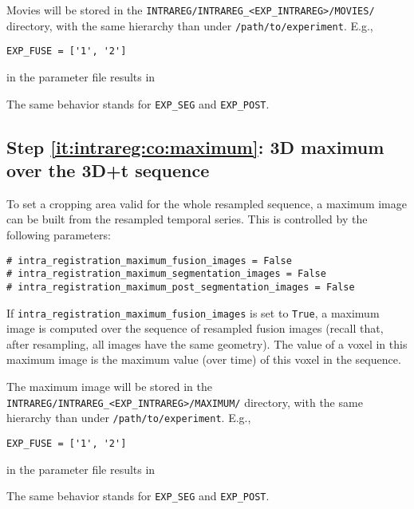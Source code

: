 Movies will be stored in the
\texttt{INTRAREG/INTRAREG\_<EXP\_INTRAREG>/MOVIES/} directory, with the same
hierarchy than under \texttt{/path/to/experiment}. E.g., 
\begin{verbatim}
EXP_FUSE = ['1', '2']
\end{verbatim}
in the parameter file results in

\mbox{}
\mbox{}

The same behavior stands for \texttt{EXP\_SEG} and  \texttt{EXP\_POST}.

\subsection{Step \ref{it:intrareg:co:maximum}: 3D maximum over the 3D+t sequence}
\label{sec:cli:intraregistration:maximum}

To set a cropping area valid for the whole resampled sequence, a maximum image can be built from the resampled temporal series. This is controlled by the following parameters:
\begin{verbatim}
# intra_registration_maximum_fusion_images = False
# intra_registration_maximum_segmentation_images = False
# intra_registration_maximum_post_segmentation_images = False
\end{verbatim}

If \verb|intra_registration_maximum_fusion_images| is set to \verb|True|, a maximum image is computed over the sequence of resampled fusion images (recall that, after resampling, all images have the same geometry). The value of a voxel in this maximum image is the maximum value (over time) of this voxel in the sequence.


The maximum image will be stored in the
\texttt{INTRAREG/INTRAREG\_<EXP\_INTRAREG>/MAXIMUM/} directory, with the same
hierarchy than under \texttt{/path/to/experiment}. E.g., 
\begin{verbatim}
EXP_FUSE = ['1', '2']
\end{verbatim}
in the parameter file results in

\mbox{}
\mbox{}

The same behavior stands for \texttt{EXP\_SEG} and  \texttt{EXP\_POST}.
